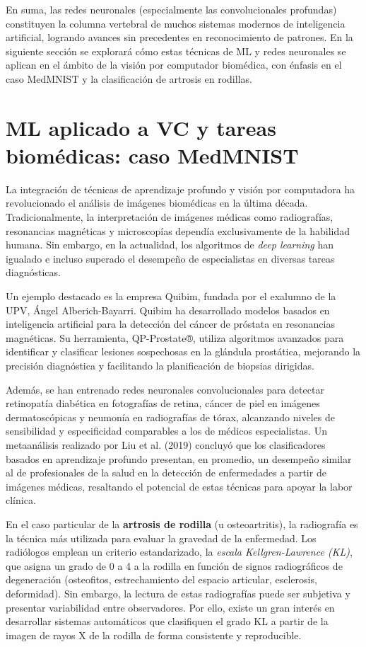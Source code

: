 \documentclass[11pt,spanish,listoffigures,listoftables]{tfgetsinf}
\begin{document}
En suma, las redes neuronales (especialmente las convolucionales profundas) constituyen la columna vertebral de muchos sistemas modernos de inteligencia artificial, 
logrando avances sin precedentes en reconocimiento de patrones. En la siguiente sección se explorará cómo estas técnicas de ML y redes neuronales se aplican en el ámbito de la visión por 
computador biomédica, con énfasis en el caso MedMNIST y la clasificación de artrosis en rodillas.

\section{ML aplicado a VC y tareas biomédicas: caso MedMNIST}\label{sec:ml-medical} 
La integración de técnicas de aprendizaje profundo y visión por computadora ha revolucionado el análisis de imágenes biomédicas en 
la última década. Tradicionalmente, la interpretación de imágenes médicas como radiografías, resonancias magnéticas y microscopías 
dependía exclusivamente de la habilidad humana. Sin embargo, en la actualidad, los algoritmos de \textit{deep learning} han igualado 
e incluso superado el desempeño de especialistas en diversas tareas diagnósticas.

Un ejemplo destacado es la empresa Quibim, fundada por el exalumno de la UPV, Ángel Alberich-Bayarri. Quibim ha desarrollado modelos 
basados en inteligencia artificial para la detección del cáncer de próstata en resonancias magnéticas. Su herramienta, QP-Prostate®, 
utiliza algoritmos avanzados para identificar y clasificar lesiones sospechosas en la glándula prostática, mejorando la precisión 
diagnóstica y facilitando la planificación de biopsias dirigidas.

Además, se han entrenado redes neuronales convolucionales para detectar retinopatía diabética en fotografías de retina, cáncer de 
piel en imágenes dermatoscópicas y neumonía en radiografías de tórax, alcanzando niveles de sensibilidad y especificidad 
comparables a los de médicos especialistas. Un metaanálisis realizado por Liu et al. (2019) concluyó que los clasificadores 
basados en aprendizaje profundo presentan, en promedio, un desempeño similar al de profesionales de la salud en la detección de 
enfermedades a partir de imágenes médicas, resaltando el potencial de estas técnicas para apoyar la labor clínica.

En el caso particular de la \textbf{artrosis de rodilla} (u osteoartritis), la radiografía es la técnica más utilizada para evaluar 
la gravedad de la enfermedad. Los radiólogos emplean un criterio estandarizado, la \textit{escala Kellgren-Lawrence (KL)}, que asigna 
un grado de 0 a 4 a la rodilla en función de signos radiográficos de degeneración (osteofitos, estrechamiento del espacio articular, 
esclerosis, deformidad). Sin embargo, la lectura de estas radiografías puede ser subjetiva y presentar variabilidad entre observadores.
Por ello, existe un gran interés en desarrollar sistemas automáticos que clasifiquen el grado KL a partir de la imagen de rayos X de 
la rodilla de forma consistente y reproducible. 
\end{document}
